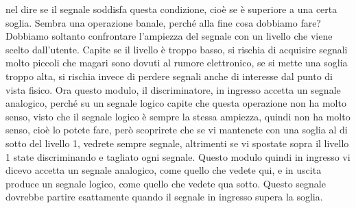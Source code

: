 nel dire se il segnale soddisfa questa condizione, cioè se è superiore a una certa soglia. Sembra una operazione banale, perché alla fine cosa dobbiamo fare? Dobbiamo soltanto confrontare l'ampiezza del segnale con un livello che viene scelto dall'utente. Capite se il livello è troppo basso, si rischia di acquisire segnali molto piccoli che magari sono dovuti al rumore elettronico, se si mette una soglia troppo alta, si rischia invece di perdere segnali anche di interesse dal punto di vista fisico. Ora questo modulo, il discriminatore, in ingresso accetta un segnale analogico, perché su un segnale logico capite che questa operazione non ha molto senso, visto che il segnale logico è sempre la stessa ampiezza, quindi non ha molto senso, cioè lo potete fare, però scoprirete che se vi mantenete con una soglia al di sotto del livello 1, vedrete sempre segnale, altrimenti se vi spostate sopra il livello 1 state discriminando e tagliato ogni segnale. Questo modulo quindi in ingresso vi dicevo accetta un segnale analogico, come quello che vedete qui, e in uscita produce un segnale logico, come quello che vedete qua sotto. Questo segnale dovrebbe partire esattamente quando il segnale in ingresso supera la soglia. 


